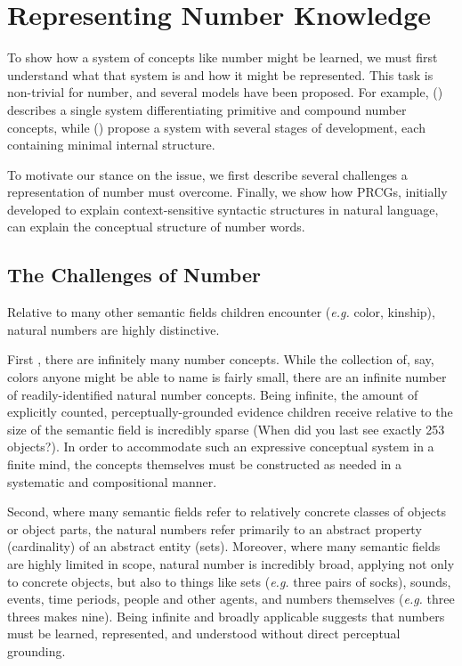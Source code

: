 \documentclass[10pt,letterpaper]{article}
\begin{document}
\section{Representing Number Knowledge}

To show how a system of concepts like number might be learned, we must
first understand what that system is and how it might be represented.
This task is non-trivial for number, and several models have been
proposed. For example, \citeauthor{hurford1975linguistic}
(\citeyear{hurford1975linguistic}) describes a single system
differentiating primitive and compound number concepts, while
\citeauthor{siegler1982development}
(\citeyear{siegler1982development}) propose a system with several
stages of development, each containing minimal internal structure.

To motivate our stance on the issue, we first describe several
challenges a representation of number must overcome. Finally, we show
how PRCGs, initially developed to explain context-sensitive syntactic
structures in natural language, can explain the conceptual structure
of number words.

\subsection{The Challenges of Number}

Relative to many other semantic fields children encounter ({\it e.g.}
color, kinship), natural numbers are highly distinctive.


First , there are infinitely many number concepts. While the
collection of, say, colors anyone might be able to name is fairly
small, there are an infinite number of readily-identified natural
number concepts. Being infinite, the amount of explicitly counted,
perceptually-grounded evidence children receive relative to the size
of the semantic field is incredibly sparse (When did you last see
exactly 253 objects?). In order to accommodate such an expressive
conceptual system in a finite mind, the concepts themselves must be
constructed as needed in a systematic and compositional manner.

Second, where many semantic fields refer to relatively concrete
classes of objects or object parts, the natural numbers refer
primarily to an abstract property (cardinality) of an abstract entity
(sets). Moreover, where many semantic fields are highly limited in
scope, natural number is incredibly broad, applying not only to
concrete objects, but also to things like sets ({\it e.g.} three pairs
of socks), sounds, events, time periods, people and other agents, and
numbers themselves ({\it e.g.} three threes makes nine). Being
infinite and broadly applicable suggests that numbers must be learned,
represented, and understood without direct perceptual grounding.
\end{document}

